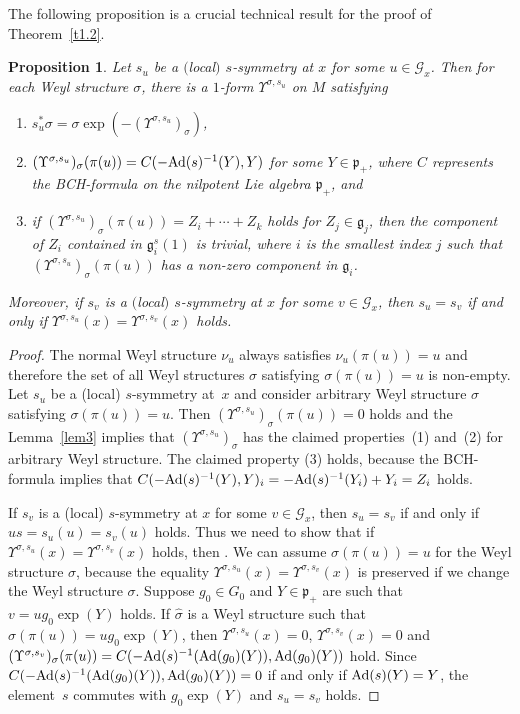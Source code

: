 \documentclass[10pt,a4paper]{amsart}
\newcommand{\si}{\sigma}
\newcommand{\ba}{\mathcal{G}}
\newcommand{\fg}{\mathfrak g}
\newcommand{\fp}{\mathfrak p}
\newcommand{\Ad}{{\rm Ad}}
\newcommand{\U}{\Upsilon}
\numberwithin{equation}{section}
\newtheorem{Proposition}[Theorem]{Proposition}
 { \theoremstyle{definition}
\newtheorem{Definition}[Theorem]{Definition}
\newtheorem{Example}[Theorem]{Example}
\newtheorem{Remark}[Theorem]{Remark} }
\begin{document}
The following proposition is a crucial technical result for the proof of Theorem~\ref{t1.2}.

\begin{Proposition} \label{auto-action}
Let $s_u$ be a $($local$)$ $s$-symmetry at $x$ for some $u \in \ba_x$. Then for each Weyl structure $\si$, there is a $1$-form $\U^{\si,s_u}$ on $M$ satisfying
\begin{enumerate}\itemsep=0pt
\item[$1)$] $s_u^*\si=\si\exp(-(\U^{\si,s_u})_\si)$,
\item[$2)$] $(\U^{\si,s_u})_\si(\pi(u))=C(-\Ad(s)^{-1}(Y),Y)$ for some $Y\in \fp_+$,
where $C$ represents the BCH-formula on the nilpotent Lie algebra $\fp_+$, and
\item[$3)$] if $(\U^{\si,s_u})_\si(\pi(u))=Z_{i}+\cdots+Z_k$ holds for $Z_{j}\in \fg_j$, then the component of $Z_{i}$ contained in $\fg_i^s(1)$ is trivial, where $i$ is the smallest index $j$ such that $(\U^{\si,s_u})_\si(\pi(u))$ has a non-zero component in $\fg_i$.
\end{enumerate}
Moreover, if $s_v$ is a $($local$)$ $s$-symmetry at $x$ for some $v\in \ba_x$, then $s_u=s_v$ if and only if $\U^{\si,s_u}(x)=\U^{\si,s_v}(x)$ holds.
\end{Proposition}
\begin{proof}
The normal Weyl structure $\nu_u$ always satisf\/ies $\nu_u(\pi(u))=u$ and therefore the set of all Weyl structures $\si$ satisfying $\si(\pi(u))=u$ is non-empty. Let $s_u$ be a (local) $s$-symmetry at~$x$ and consider arbitrary Weyl structure $\si$ satisfying $\si(\pi(u))=u$. Then $(\U^{\si,s_u})_\si(\pi(u))=0$ holds and the Lemma~\ref{lem3} implies that $(\U^{\si,s_u})_\si$ has the claimed properties~(1) and~(2) for arbitrary Weyl structure. The claimed property (3) holds, because the BCH-formula implies that $C(-\Ad(s)^{-1}(Y),Y)_i=-\Ad(s)^{-1}(Y_i)+Y_i=Z_i$ holds.

If $s_v$ is a (local) $s$-symmetry at $x$ for some $v\in \ba_x$, then $s_u=s_v$ if and only if $us=s_u(u)=s_v(u)$ holds. Thus we need to show that if $\U^{\si,s_u}(x)=\U^{\si,s_v}(x)$ holds, then . We can assume $\si(\pi(u))=u$ for the Weyl structure $\si$, because the equality $\U^{\si,s_u}(x)=\U^{\si,s_v}(x)$ is preserved if we change the Weyl structure $\si$. Suppose $g_0\in G_0$ and $Y\in \fp_+$ are such that $v=ug_0\exp(Y)$ holds. If $\hat \si$ is a Weyl structure such that $\hat \si(\pi(u))=ug_0\exp(Y)$, then $\U^{\si,s_u}(x)= 0$, $\U^{\hat \si,s_v}(x)=0$ and $(\U^{\si,s_v})_\si(\pi(u))=C(-\Ad(s)^{-1}(\Ad(g_0)(Y)),\Ad(g_0)(Y))$ hold. Since $C(-\Ad(s)^{-1}(\Ad(g_0)(Y)),\Ad(g_0)(Y))=0$ if and only if $\Ad(s)(Y)=Y$, the element~$s$ commutes with $g_0\exp(Y)$ and $s_u=s_v$ holds.
\end{proof}
\end{document}
